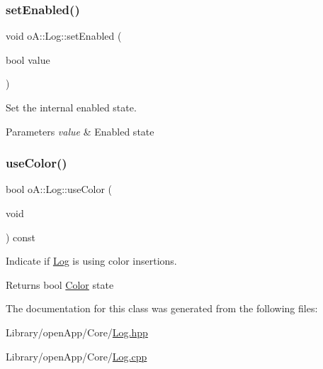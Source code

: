 \mbox{\label{classo_a_1_1_log_a7c4699ea7ad0c8b910b4a3fc57ba5afe}} 
\subsubsection{\texorpdfstring{set\+Enabled()}{setEnabled()}}
{\footnotesize\ttfamily void o\+A\+::\+Log\+::set\+Enabled (\begin{DoxyParamCaption}\item[{bool}]{value }\end{DoxyParamCaption})\hspace{0.3cm}{\ttfamily [noexcept]}}



Set the internal enabled state. 


\begin{DoxyParams}{Parameters}
{\em value} & Enabled state \\
\hline
\end{DoxyParams}
\mbox{\label{classo_a_1_1_log_a212bf1558c244679cf0e361fc1cf1e9a}} 
\subsubsection{\texorpdfstring{use\+Color()}{useColor()}}
{\footnotesize\ttfamily bool o\+A\+::\+Log\+::use\+Color (\begin{DoxyParamCaption}\item[{void}]{ }\end{DoxyParamCaption}) const\hspace{0.3cm}{\ttfamily [noexcept]}}



Indicate if \mbox{\hyperlink{classo_a_1_1_log_a8f57798a38bc53782107ee07f2f2caa5}{Log}} is using color insertions. 

\begin{DoxyReturn}{Returns}
bool \mbox{\hyperlink{classo_a_1_1_color}{Color}} state 
\end{DoxyReturn}


The documentation for this class was generated from the following files\+:\begin{DoxyCompactItemize}
\item 
Library/open\+App/\+Core/\mbox{\hyperlink{_log_8hpp}{Log.\+hpp}}\item 
Library/open\+App/\+Core/\mbox{\hyperlink{_log_8cpp}{Log.\+cpp}}\end{DoxyCompactItemize}
